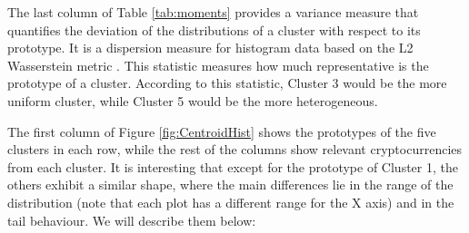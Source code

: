\documentclass{bmcart}
\begin{document}
The last column of Table  \ref{tab:moments} provides a variance measure that quantifies the deviation of the distributions of a cluster with respect to its prototype. It is a dispersion measure for histogram data based on the L2 Wasserstein metric \cite{Irpino2015BasicSF}. This statistic measures how much representative is the prototype of a cluster. According to this statistic, Cluster 3 would be the more uniform cluster, while Cluster 5 would be the more heterogeneous.

The first column of Figure \ref{fig:CentroidHist} shows the prototypes of the five clusters in each row, while the rest of the columns show relevant cryptocurrencies from each cluster. It is interesting that except for the prototype of Cluster 1, the others exhibit a similar shape, where the main differences lie in the range of the distribution (note that each plot has a different range for the X axis) and in the tail behaviour.  We will describe them below:
\end{document}
